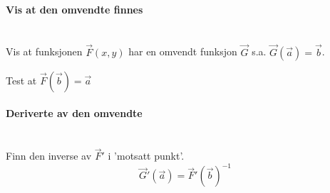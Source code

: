 \paragraph{Vis at den omvendte finnes} \mbox{} \\
Vis at funksjonen $\vec{F}(x,y)$ har en omvendt funksjon
$\vec{G}$ s.a. $\vec{G}(\vec{a})=\vec{b}$.

Test at $\vec{F}(\vec{b}) = \vec{a}$



\paragraph{Deriverte av den omvendte} \mbox{} \\
Finn den inverse av $\vec{F}'$ i 'motsatt punkt'.
$$\vec{G}'(\vec{a}) = \vec{F}'(\vec{b})^{-1}$$
